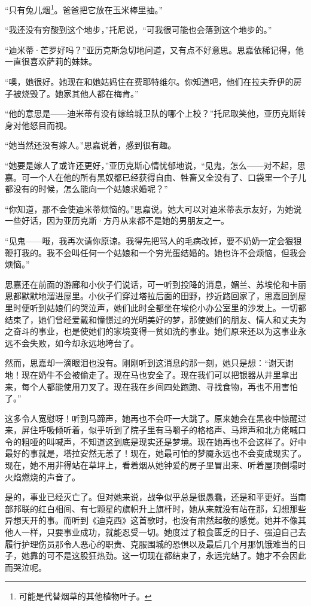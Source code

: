 \par “只有兔儿烟\footnote{可能是代替烟草的其他植物叶子。}。爸爸把它放在玉米棒里抽。”
\par “我还没有穷酸到这个地步，”托尼说，“可我很可能也会落到这个地步的。”
\par “迪米蒂·芒罗好吗？”亚历克斯急切地问道，又有点不好意思。思嘉依稀记得，他一直很喜欢萨莉的妹妹。
\par “噢，她很好。她现在和她姑妈住在费耶特维尔。你知道吧，他们在拉夫乔伊的房子被烧毁了。她家其他人都在梅肯。”
\par “他的意思是——迪米蒂有没有嫁给城卫队的哪个上校？”托尼取笑他，亚历克斯转身对他怒目而视。
\par “她当然还没有嫁人。”思嘉说着，感到很有趣。
\par “她要是嫁人了或许还更好，”亚历克斯心情忧郁地说，“见鬼，怎么——对不起，思嘉。可一个人在他的所有黑奴都已经获得自由、牲畜又全没有了、口袋里一个子儿都没有的时候，怎么能向一个姑娘求婚呢？”
\par “你知道，那不会使迪米蒂烦恼的。”思嘉说。她大可以对迪米蒂表示友好，为她说一些好话，因为亚历克斯·方丹从来都不是她的男朋友之一。
\par “见鬼——哦，我再次请你原谅。我得先把骂人的毛病改掉，要不奶奶一定会狠狠鞭打我的。我不会叫任何一个姑娘和一个穷光蛋结婚的。她也许不会烦恼，但我会烦恼。”
\par 思嘉还在前面的游廊和小伙子们说话，可一听到投降的消息，媚兰、苏埃伦和卡丽恩都默默地溜进屋里。小伙子们穿过塔拉后面的田野，抄近路回家了，思嘉回到屋里时便听到姑娘们的哭泣声，她们此时全都坐在埃伦小办公室里的沙发上。一切都结束了，她们曾经爱戴和憧憬过的光明美好的梦，那使她们的朋友、情人和丈夫为之奋斗的事业，也是使她们的家境变得一贫如洗的事业。她们原来还以为这事业永远不会失败，如今却永远地垮台了。
\par 然而，思嘉却一滴眼泪也没有。刚刚听到这消息的那一刻，她只是想：“谢天谢地！现在奶牛不会被偷走了。现在马也安全了。现在我们可以把银器从井里拿出来，每个人都能使用刀叉了。现在我在乡间四处跑跑、寻找食物，再也不用害怕了。”
\par 这多令人宽慰呀！听到马蹄声，她再也不会吓一大跳了。原来她会在黑夜中惊醒过来，屏住呼吸倾听着，似乎听到了院子里有马嚼子的格格声、马蹄声和北方佬喊口令的粗哑的叫喊声，不知道这到底是现实还是梦境。现在她再也不会这样了。好中最好的事就是，塔拉安然无恙了！现在，她最可怕的梦魇永远也不会变成现实了。现在，她不用非得站在草坪上，看着烟从她钟爱的房子里冒出来、听着屋顶倒塌时火焰燃烧的声音了。
\par 是的，事业已经灭亡了。但对她来说，战争似乎总是很愚蠢，还是和平更好。当南部邦联的红白相间、有七颗星的旗帜升上旗杆时，她从来就没有站在那，幻想那些异想天开的事。而听到《迪克西》这首歌时，也没有肃然起敬的感觉。她并不像其他人一样，只要事业成功，就能忍受一切。她度过了粮食匮乏的日子、强迫自己去履行护理伤员那令人恶心的职责、克服围城的恐惧以及最后几个月那饥饿难当的日子，她靠的可不是这股狂热劲。这一切现在都结束了，永远完结了。她才不会因此而哭泣呢。
